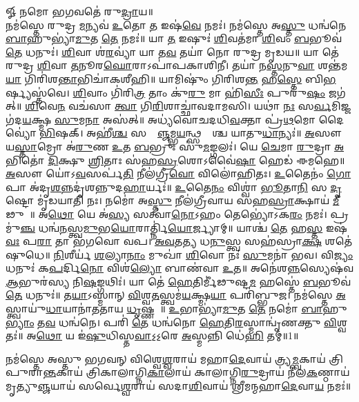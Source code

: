 𑍐 𑌨𑌮𑍋 𑌭𑌗𑌵𑌤𑍇॑ 𑌰𑍁\ul{𑌦𑍍𑌰𑌾}𑌯॥\\
 𑌨𑌮॑𑌸𑍍𑌤𑍇 𑌰𑍁𑌦𑍍𑌰 \ul{𑌮}𑌨𑍍𑌯𑌵॑ \ul{𑌉}𑌤𑍋 \ul{𑌤} 𑌇𑌷॑\ul{𑌵𑍇} 𑌨𑌮𑌃॑। 𑌨𑌮॑𑌸𑍍𑌤𑍇 𑌅\ul{𑌸𑍍𑌤𑍁} 𑌧𑌨𑍍𑌵॑𑌨𑍇 \ul{𑌬𑌾}𑌹𑍁𑌭𑍍𑌯𑌾॑\ul{𑌮𑍁}𑌤 \ul{𑌤𑍇} 𑌨𑌮𑌃॑॥ 𑌯𑌾 \ul{𑌤} 𑌇𑌷𑍁𑌃॑ \ul{𑌶𑌿}𑌵𑌤॑𑌮𑌾 \ul{𑌶𑌿}𑌵𑌂 \ul{𑌬}𑌭𑍂𑌵॑ \ul{𑌤𑍇} 𑌧𑌨𑍁𑌃॑। \ul{𑌶𑌿}𑌵𑌾 𑌶॑\ul{𑌰}𑌵𑍍𑌯𑌾॑ 𑌯𑌾 𑌤\ul{𑌵} 𑌤𑌯𑌾॑ 𑌨𑍋 𑌰𑍁𑌦𑍍𑌰 𑌮𑍃𑌡𑌯॥ 𑌯𑌾 𑌤𑍇॑ 𑌰𑍁𑌦𑍍𑌰 \ul{𑌶𑌿}𑌵𑌾 \ul{𑌤}𑌨𑍂𑌰\ul{𑌘𑍋}𑌰𑌾𑌽𑌪𑌾॑𑌪𑌕𑌾𑌶𑌿𑌨𑍀। 𑌤𑌯𑌾॑ 𑌨\ul{𑌸𑍍𑌤}𑌨𑍁\ul{𑌵𑌾} 𑌶𑌨𑍍𑌤॑𑌮\ul{𑌯𑌾} 𑌗𑌿𑌰𑌿॑𑌶\ul{𑌨𑍍𑌤𑌾}\-𑌭𑌿𑌚𑌾॑𑌕𑌶𑍀𑌹𑌿॥ 𑌯𑌾𑌮𑌿𑌷𑍁𑌂॑ 𑌗𑌿𑌰𑌿𑌶\ul{𑌨𑍍𑌤} 𑌹\ul{𑌸𑍍𑌤𑍇} 𑌬𑌿\ul{𑌭}𑌰𑍍𑌷𑍍𑌯𑌸𑍍𑌤॑𑌵𑍇। \ul{𑌶𑌿}𑌵𑌾𑌂 𑌗𑌿॑𑌰𑌿\ul{𑌤𑍍𑌰} 𑌤𑌾𑌂 𑌕𑍁॑\ul{𑌰𑍁} 𑌮𑌾 𑌹𑌿॑\ul{𑌸𑍀𑌃} 𑌪𑍁𑌰𑍁॑\ul{𑌷𑌂} 𑌜𑌗॑𑌤𑍍॥ \ul{𑌶𑌿}𑌵𑍇\ul{𑌨} 𑌵𑌚॑𑌸𑌾 \ul{𑌤𑍍𑌵𑌾} 𑌗𑌿\ul{𑌰𑌿}𑌶𑌾𑌚𑍍𑌛𑌾॑𑌵𑌦𑌾𑌮𑌸𑌿। 𑌯𑌥𑌾॑ \ul{𑌨𑌃} 𑌸\ul{𑌰𑍍𑌵}𑌮𑌿𑌜𑍍𑌜𑌗॑𑌦\ul{𑌯}𑌕𑍍𑌷𑍍𑌮 \ul{𑌸𑍁}𑌮\ul{𑌨𑌾} 𑌅𑌸॑𑌤𑍍॥ 𑌅𑌧𑍍𑌯॑𑌵𑍋𑌚𑌦𑌧𑌿\ul{𑌵}𑌕𑍍𑌤𑌾 𑌪𑍍𑌰॑\ul{𑌥}𑌮𑍋 𑌦𑍈𑌵𑍍𑌯𑍋॑ \ul{𑌭𑌿}𑌷𑌕𑍍।  𑌅𑌹𑍀॑\ul{𑌶𑍍𑌚} 𑌸𑌰𑍍𑌵𑌾᳚\ul{𑌞𑍍𑌜}𑌮𑍍𑌭\ul{𑌯}𑌨𑍍𑌥𑍍𑌸𑌰𑍍𑌵𑌾᳚𑌶𑍍𑌚 𑌯𑌾𑌤𑍁\ul{𑌧𑌾}𑌨𑍍𑌯𑌃॑॥ \ul{𑌅}𑌸𑍗 𑌯\ul{𑌸𑍍𑌤𑌾}𑌮𑍍𑌰𑍋 𑌅॑\ul{𑌰𑍁}𑌣 \ul{𑌉}𑌤 \ul{𑌬}𑌭𑍍𑌰𑍁𑌃 𑌸𑍁॑\ul{𑌮}𑌙𑍍𑌗𑌲𑌃॑। 𑌯𑍇 \ul{𑌚𑍇}𑌮𑌾 \ul{𑌰𑍁}𑌦𑍍𑌰𑌾 \ul{𑌅}𑌭𑌿𑌤𑍋॑ \ul{𑌦𑌿}𑌕𑍍𑌷𑍁 \ul{𑌶𑍍𑌰𑌿}𑌤𑌾𑌃 𑌸॑𑌹\ul{𑌸𑍍𑌰}𑌶𑍋𑌽𑌵𑍈॑\ul{𑌷𑌾}\ul{} 𑌹𑍇𑌡॑ 𑌈𑌮𑌹𑍇॥ \ul{𑌅}𑌸𑍗 𑌯𑍋॑𑌽\ul{𑌵}𑌸𑌰𑍍𑌪॑\ul{𑌤𑌿} 𑌨𑍀𑌲॑𑌗𑍍𑌰𑍀\ul{𑌵𑍋} 𑌵𑌿𑌲𑍋॑𑌹𑌿𑌤𑌃। \ul{𑌉}𑌤𑍈𑌨𑌂॑ \ul{𑌗𑍋}𑌪𑌾 𑌅॑𑌦𑍃\ul{𑌶}\ul{𑌨𑍍𑌨}𑌦𑍃॑𑌶𑌨𑍍𑌨𑍁𑌦\ul{𑌹𑌾}𑌰𑍍𑌯𑌃॑॥ \ul{𑌉}𑌤𑍈\ul{𑌨𑌂} 𑌵𑌿𑌶𑍍𑌵𑌾॑ \ul{𑌭𑍂}𑌤𑌾\ul{𑌨𑌿} 𑌸 \ul{𑌦𑍃}𑌷𑍍𑌟𑍋 𑌮𑍃॑𑌡𑌯𑌾𑌤𑌿 𑌨𑌃। 𑌨𑌮𑍋॑ 𑌅\ul{𑌸𑍍𑌤𑍁} 𑌨𑍀𑌲॑𑌗𑍍𑌰𑍀𑌵𑌾𑌯 𑌸𑌹\ul{𑌸𑍍𑌰𑌾}𑌕𑍍𑌷𑌾𑌯॑ \ul{𑌮𑍀}𑌢𑍁𑌷𑍇᳚॥ 𑌅\ul{𑌥𑍋} 𑌯𑍇 𑌅॑\ul{𑌸𑍍𑌯} 𑌸𑌤𑍍𑌵𑌾॑\ul{𑌨𑍋}𑌽𑌹𑌂 𑌤𑍇𑌭𑍍𑌯𑍋॑𑌽𑌕\ul{𑌰𑌂} 𑌨𑌮𑌃॑। 𑌪𑍍𑌰 𑌮𑍁॑\ul{𑌞𑍍𑌚} 𑌧𑌨𑍍𑌵॑\ul{𑌨}𑌸𑍍𑌤𑍍𑌵\ul{𑌮𑍁}𑌭\ul{𑌯𑍋}𑌰𑌾𑌰𑍍𑌤𑍍𑌨𑌿॑\ul{𑌯𑍋}𑌰𑍍𑌜𑍍𑌯𑌾𑌮𑍍॥ 𑌯𑌾𑌶𑍍𑌚॑ \ul{𑌤𑍇} 𑌹\ul{𑌸𑍍𑌤} 𑌇𑌷॑\ul{𑌵𑌃} 𑌪\ul{𑌰𑌾} 𑌤𑌾 𑌭॑𑌗𑌵𑍋 𑌵𑌪। \ul{𑌅}\ul{𑌵}𑌤\ul{𑌤𑍍𑌯} 𑌧\ul{𑌨𑍁}𑌸𑍍𑌤𑍍𑌵 𑌸𑌹॑𑌸𑍍𑌰𑌾\ul{𑌕𑍍𑌷} 𑌶𑌤𑍇॑𑌷𑍁𑌧𑍇॥ \ul{𑌨𑌿}𑌶𑍀𑌰𑍍𑌯॑ \ul{𑌶}𑌲𑍍𑌯𑌾\ul{𑌨𑌾𑌂} 𑌮𑍁𑌖𑌾॑ \ul{𑌶𑌿}𑌵𑍋 𑌨𑌃॑ \ul{𑌸𑍁}𑌮𑌨𑌾॑ 𑌭𑌵। 𑌵𑌿\ul{𑌜𑍍𑌯𑌂} 𑌧𑌨𑍁𑌃॑ 𑌕\ul{𑌪}𑌰𑍍𑌦𑌿\ul{𑌨𑍋} 𑌵𑌿𑌶॑\ul{𑌲𑍍𑌯𑍋} 𑌬𑌾𑌣॑𑌵𑌾 \ul{𑌉}𑌤॥
 𑌅𑌨𑍇॑𑌶\ul{𑌨𑍍𑌨}\-𑌸𑍍𑌯𑍇𑌷॑𑌵 \ul{𑌆}𑌭𑍁𑌰॑𑌸𑍍𑌯 𑌨𑌿\ul{𑌷}𑌙𑍍𑌗𑌥𑌿𑌃॑। 𑌯𑌾 𑌤𑍇॑ \ul{𑌹𑍇}𑌤𑌿𑌰𑍍𑌮𑍀॑𑌢𑍁𑌷𑍍𑌟\ul{𑌮} 𑌹𑌸𑍍𑌤𑍇॑ \ul{𑌬}𑌭𑍂𑌵॑ \ul{𑌤𑍇} 𑌧𑌨𑍁𑌃॑॥ 𑌤\ul{𑌯𑌾}𑌽𑌸𑍍𑌮𑌾𑌨𑍍 \ul{𑌵𑌿}𑌶𑍍𑌵\ul{𑌤}𑌸𑍍𑌤𑍍𑌵𑌮॑\ul{𑌯}𑌕𑍍𑌷𑍍𑌮\ul{𑌯𑌾} 𑌪𑌰𑌿॑𑌬𑍍𑌭𑍁𑌜। 𑌨𑌮॑𑌸𑍍𑌤𑍇 \ul{𑌅}𑌸𑍍𑌤𑍍𑌵𑌾𑌯𑍁॑\ul{𑌧𑌾}𑌯𑌾𑌨𑌾॑𑌤𑌤𑌾𑌯 \ul{𑌧𑍃}𑌷𑍍𑌣𑌵𑍇᳚॥ \ul{𑌉}𑌭𑌾𑌭𑍍𑌯𑌾॑\ul{𑌮𑍁}𑌤 \ul{𑌤𑍇} 𑌨𑌮𑍋॑ \ul{𑌬𑌾}𑌹𑍁\ul{𑌭𑍍𑌯𑌾𑌂} 𑌤\ul{𑌵} 𑌧𑌨𑍍𑌵॑𑌨𑍇। 𑌪𑌰𑌿॑ \ul{𑌤𑍇} 𑌧𑌨𑍍𑌵॑𑌨𑍋 \ul{𑌹𑍇}𑌤𑌿\ul{𑌰}𑌸𑍍𑌮𑌾𑌨𑍍𑌵𑍃॑𑌣𑌕𑍍𑌤𑍁 \ul{𑌵𑌿}𑌶𑍍𑌵𑌤𑌃॑॥ 𑌅\ul{𑌥𑍋} 𑌯 𑌇॑\ul{𑌷𑍁}𑌧𑌿𑌸𑍍𑌤\ul{𑌵𑌾}𑌽॒𑌽॒𑌰𑍇 \ul{𑌅}𑌸𑍍𑌮𑌨𑍍𑌨𑌿 𑌧𑍇॑\ul{𑌹𑌿} 𑌤𑌮𑍍॥1॥

 
\lbrack 𑌨𑌮॑𑌸𑍍𑌤𑍇 𑌅𑌸𑍍𑌤𑍁 𑌭𑌗𑌵𑌨𑍍 𑌵𑌿𑌶𑍍𑌵𑍇\ul{𑌶𑍍𑌵}𑌰𑌾𑌯॑ 𑌮𑌹𑌾\ul{𑌦𑍇}𑌵𑌾𑌯॑ 𑌤𑍍𑌰𑍍𑌯\ul{𑌮𑍍𑌬}𑌕𑌾𑌯॑ 𑌤𑍍𑌰𑌿𑌪𑍁𑌰𑌾\ul{𑌨𑍍𑌤}𑌕𑌾𑌯॑ 𑌤𑍍𑌰𑌿𑌕𑌾\lbrack 𑌲𑌾\rbrack 𑌗𑍍𑌨𑌿\ul{𑌕𑌾}𑌲𑌾𑌯॑ 𑌕𑌾𑌲𑌾𑌗𑍍𑌨𑌿\ul{𑌰𑍁}𑌦𑍍𑌰𑌾𑌯॑ 𑌨𑍀𑌲\ul{𑌕}𑌣𑍍𑌠𑌾𑌯॑ 𑌮𑍃𑌤𑍍𑌯𑍁\ul{𑌞𑍍𑌜}𑌯𑌾𑌯॑ 𑌸𑌰𑍍𑌵𑍇\ul{𑌶𑍍𑌵}𑌰𑌾𑌯॑ 𑌸𑌦𑌾\ul{𑌶𑌿}𑌵𑌾𑌯॑ 𑌶𑍍𑌰𑍀𑌮𑌨𑍍𑌮𑌹𑌾\ul{𑌦𑍇}𑌵𑌾\ul{𑌯} 𑌨𑌮𑌃॑॥\rbrack

